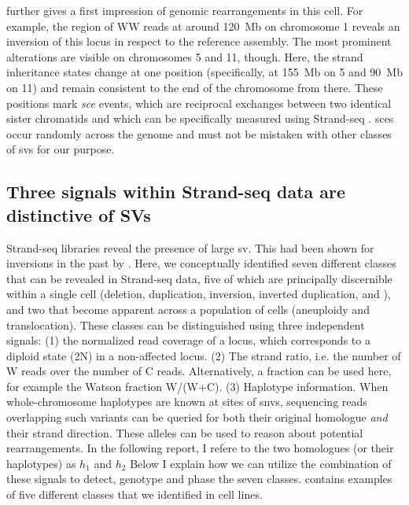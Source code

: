  further gives a first impression of genomic rearrangements
in this cell. For example, the region of WW reads at around 120~Mb on chromosome
1 reveals an inversion of this locus in respect to the reference assembly. The
most prominent alterations are visible on chromosomes 5 and 11, though. Here,
the strand inheritance states change at one position (specifically,
at 155~Mb on 5 and 90~Mb on 11) and remain consistent to
the end of the chromosome from there. These positions mark \emph{\acf{sce}} events,
which are reciprocal exchanges between two identical sister chromatids and
which can be specifically measured using Strand-seq \citep{Falconer2012}.
\Acp{sce} occur randomly across the genome and must not be mistaken with other
classes of \acp{sv} for our purpose.





\subsection{Three signals within Strand-seq data are distinctive of SVs}
\label{sec:mosaic_concept}

Strand-seq libraries reveal the presence of large \Acl{sv}. This had been shown
for inversions in the past by \citet{Sanders2016}. Here, we conceptually identified seven
different \sv classes that can be revealed in Strand-seq data, five of which are
principally discernible within a single cell (deletion, duplication, inversion,
inverted duplication, and \loh), and two that become apparent across a population
of cells (aneuploidy and translocation). These \sv classes can be distinguished
using three independent signals: (1) the normalized read coverage of a locus,
which corresponds to a diploid state (2N) in a non-affected locus.
(2) The strand ratio, i.e. the number of W reads over the number of C reads.
Alternatively, a fraction can be used here, for example the Watson fraction
W/(W+C). (3) Haplotype information. When whole-chromosome haplotypes are known
at sites of \acp{snv}, sequencing reads overlapping such variants can be queried for
both their original homologue \emph{and} their strand direction.
These alleles can be used to reason about potential rearrangements. In the
following report, I refere to the two homologues (or their haplotypes) as $h_1$
and $h_2$
Below I explain how we can utilize the combination of these signals to detect,
genotype and phase the seven \sv classes.  contains examples of
five different \sv classes that we identified in \rpe cell lines.

